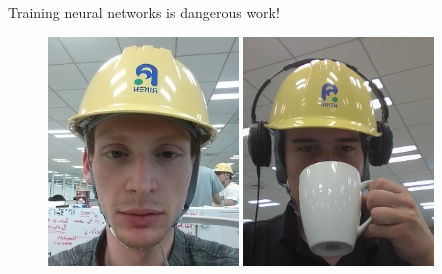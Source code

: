 \documentclass[mathserif,notheorems, hyperref={colorlinks, urlcolor=blue, linkcolor=blue}]{beamer}
\begin{document}
    \begin{frame}{Training neural networks is dangerous work!}
       
       \begin{figure}
            \centering
            \includegraphics[width=0.45\textwidth]{collaborators/helmet1} 
            \includegraphics[width=0.45\textwidth]{collaborators/helmet2} 
       \end{figure} 
    \end{frame}
    
\end{document}
